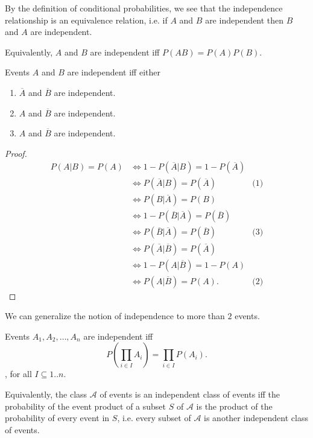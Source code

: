 By the definition of conditional probabilities, we see that the independence
relationship is an equivalence relation, i.e. if \( A \) and \( B \) are
independent then \( B \) and \( A \) are independent.

Equivalently, \( A \) and \( B \) are independent iff \( P(AB)=P(A)P(B) \).

\begin{theorem}
\label{thr:Independence between negations}
  Events \( A \) and \( B \) are independent iff either
  \begin{enumerate}
  \item \( \overline{A} \) and \( \overline{B} \) are independent.
  \item \( A \) and \( \overline{B} \) are independent.
  \item \( A \) and \( \overline{B} \) are independent.
  \end{enumerate}
\end{theorem}

\begin{proof}
  \begin{align*}
    P(A|B) = P(A) &\iff 1 - P(\overline{A}|B) = 1 - P(\overline{A})\\
                  &\iff P(\overline{A}|B) = P(\overline{A}) &\text{(1)}\\
                  &\iff P(B|\overline{A}) = P(B)\\
                  &\iff 1 - P(\overline{B}|\overline{A}) = P(\overline{B})\\
                  &\iff P(\overline{B}|\overline{A}) = P(\overline{B})
                  &\text{(3)}\\
                  &\iff P(\overline{A}|\overline{B}) = P(\overline{A})\\
                  &\iff 1 - P(A|\overline{B}) = 1 - P(A)\\
                  &\iff P(A|\overline{B}) = P(A). &\text{(2)}
  \end{align*}
\end{proof}

We can generalize the notion of independence to more than \( 2 \) events.

\begin{definition}
\label{def:Independence of multiple events}
  Events \( A_{1}, A_{2}, \ldots , A_{n} \) are independent iff
  \[
    P\left(\prod_{i \in I} A_{i} \right) = \prod_{i \in I} P(A_{i})
  .\], for all \( I \subseteq 1..n \).
  
  Equivalently, the class \( \mathcal{A} \) of events is an independent class of
  events iff the probability of the event product of a subset \( S \) of \(
  \mathcal{A} \) is the product of the probability of every event in \( S \),
  i.e. every subset of \( \mathcal{A} \) is another independent class of events.
\end{definition}

